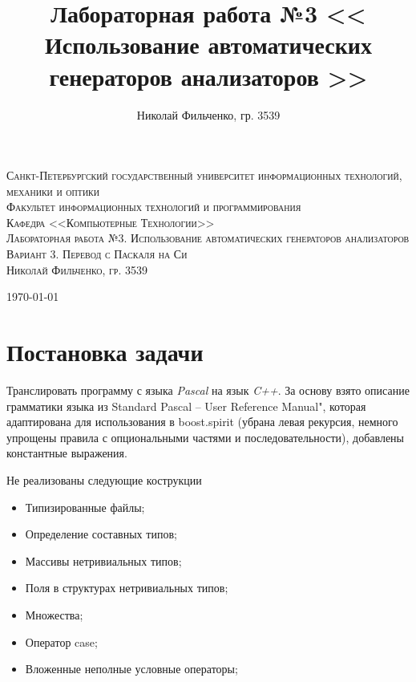 \documentclass[11pt,a4paper,oneside]{report}
\begin{document}
\title{Лабораторная работа №3 \endgraf << Использование автоматических генераторов анализаторов >>}
\author{Николай Фильченко, гр. 3539}

\begin{titlepage}

\begin{center}


\textsc{Санкт-Петербургский государственный университет
информационных технологий, механики и оптики \\
Факультет информационных технологий и программирования \\
Кафедра <<Компьютерные Технологии>>}\\[8.5cm]


\textsc{\Large Лабораторная работа №3. Использование автоматических генераторов анализаторов}\\[0.5cm]

\textsc{\Large Вариант 3. Перевод с Паскаля на Си}\\[3cm]


\textsc{Николай Фильченко, гр. 3539}

\vfill

{\large \today}

\end{center}

\end{titlepage}

\setcounter{page}{2}

\tableofcontents

\newpage

\section{Постановка задачи}

Транслировать программу с языка \emph{Pascal} на язык \emph{C++}. За основу взято описание грамматики языка 
из Standard Pascal -- User Reference Manual", которая адаптирована для использования в boost.spirit 
(убрана левая рекурсия, немного упрощены правила с опциональными частями и последовательности), добавлены
константные выражения.

Не реализованы следующие кострукции
\begin{itemize}
\item Типизированные файлы;
\item Определение составных типов;
\item Массивы нетривиальных типов;
\item Поля в структурах нетривиальных типов;
\item Множества;
\item Оператор case;
\item Вложенные неполные условные операторы;
\end{itemize}
\end{document}

